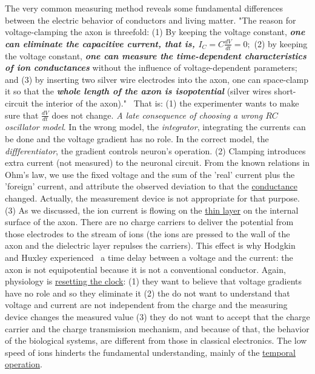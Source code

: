 The very common measuring method reveals some fundamental differences between the electric behavior of conductors and living matter.
"The reason for \hypertarget{voltage-clamping}{voltage-clamping} the axon is threefold: (1) By keeping
the voltage constant, \textit{\textbf{one can eliminate the capacitive current, that is,
$I_C = C\frac{dV}{dt} = 0;$}} (2) by keeping the voltage constant, \textbf{\textit{one can measure the
time-dependent characteristics of ion conductances}} without the influence
of voltage-dependent parameters; and (3) by inserting two silver wire electrodes into the axon, one can space-clamp it so that the \textbf{\textit{whole length of
the axon is isopotential}} (silver wires short-circuit the interior of the axon)."~\cite{JohnstonWuNeurophysiology:1995} That is: (1) the experimenter wants to make sure that $\frac{dV}{dt}$ does not change.
\textit{A late consequence of choosing a wrong $RC$ oscillator model}. 
In the wrong model, the \textit{integrator}, integrating the currents can be done and  
the voltage gradient has no role. In the correct model, the \textit{diffferentiator}, the gradient controls neuron's operation. 
(2) Clamping introduces extra current (not measured) to the
neuronal circuit. From the known relations in Ohm's law,
 we use the fixed voltage and the sum of the 
'real' current plus the 'foreign' current, and attribute the observed
deviation to that the \hyperlink{electric_resistance}{conductance} changed. Actually, the measurement device is not appropriate for that purpose. (3) As we discussed, the ion current is flowing on the \hyperlink{DynamicLayer}{thin layer} on the internal surface of the axon. There are no charge carriers to deliver the potential from those electrodes to the stream of ions (the ions
are pressed to the wall of the axon and the dielectric layer
repulses the carriers). This effect is why Hodgkin and Huxley 
experienced~\cite{HodgkinHuxley:1952} a time delay between a voltage and the current: 
the axon is not equipotential because it is not a conventional conductor. 
Again, physiology is \hyperlink{ResettingClock}{resetting the clock}: (1) they want to believe that voltage gradients have no role and so they eliminate it (2) the do not want to understand that voltage and current are not  independent from the charge and the measuring device changes the measured value (3) they do not want to accept that the charge carrier and the charge transmission mechanism, and because of that, the behavior of the biological systems, are different from those in classical electronics. The low speed of ions hinderts the fundamental understanding, mainly of the \hyperlink{temporal_dependence}{temporal operation}.

